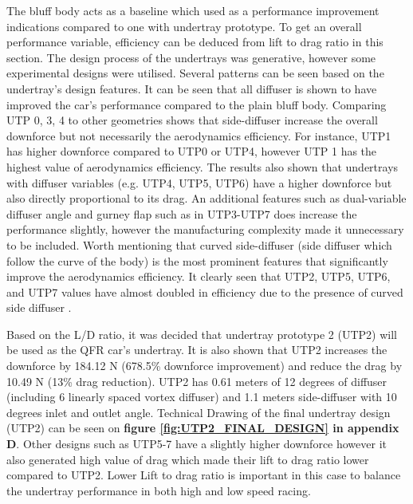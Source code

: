 \noindent The bluff body acts as a baseline which used as a performance improvement indications compared to one with undertray prototype. To get an overall performance variable, efficiency can be deduced from lift to drag ratio in this section. The design process of the undertrays was generative, however some experimental designs were utilised. Several patterns can be seen based on the undertray's design features. It can be seen that all diffuser is shown to have improved the car's performance compared to the plain bluff body. Comparing UTP 0, 3, 4 to other geometries shows that side-diffuser increase the overall downforce but not necessarily the aerodynamics efficiency. For instance, UTP1 has higher downforce compared to UTP0 or UTP4, however UTP 1 has the highest value of aerodynamics efficiency. The results also shown that undertrays with diffuser variables (e.g. UTP4, UTP5, UTP6) have a higher downforce but also directly proportional to its drag. An additional features such as dual-variable diffuser angle and gurney flap such as in UTP3-UTP7 does increase the performance slightly, however the manufacturing complexity made it unnecessary to be included.  Worth mentioning that curved side-diffuser (side diffuser which follow the curve of the body) is the most prominent features that significantly improve the aerodynamics efficiency. It clearly seen that UTP2, UTP5, UTP6, and UTP7 values have almost doubled in efficiency due to the presence of curved side diffuser .

\noindent Based on the L/D ratio, it was decided that undertray prototype 2 (UTP2) will be used as the QFR car's undertray. It is also shown that UTP2 increases the downforce by 184.12 N (678.5\% downforce improvement) and reduce the drag by 10.49 N (13\% drag reduction). UTP2 has 0.61 meters of 12 degrees of diffuser (including 6 linearly spaced vortex diffuser) and 1.1 meters side-diffuser with 10 degrees inlet and outlet angle. Technical Drawing of the final undertray design (UTP2) can be seen on \textbf{figure \ref{fig:UTP2_FINAL_DESIGN} in appendix D}. Other designs such as UTP5-7  have a slightly higher downforce however it also generated high value of drag which made their lift to drag ratio lower compared to UTP2. Lower Lift to drag ratio is important in this case to balance the undertray performance in both high and low speed racing.

